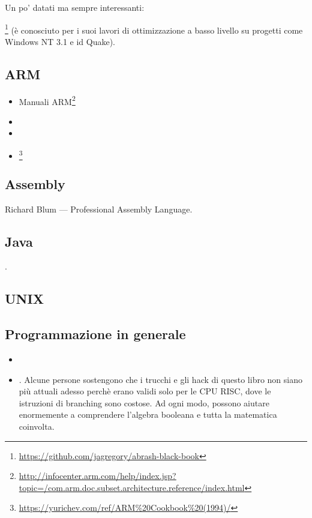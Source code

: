 Un po' datati ma sempre interessanti:

\MAbrash\footnote{\AlsoAvailableAs \url{https://github.com/jagregory/abrash-black-book}}
(è conosciuto per i suoi lavori di ottimizzazione a basso livello su progetti come Windows NT 3.1 e id Quake).

\subsection{ARM}

\begin{itemize}
\item Manuali ARM\footnote{\AlsoAvailableAs \url{http://infocenter.arm.com/help/index.jsp?topic=/com.arm.doc.subset.architecture.reference/index.html}}

\item \ARMSevenRef

\item \ARMSixFourRefURL

\item \ARMCookBook\footnote{\AlsoAvailableAs \url{https://yurichev.com/ref/ARM%20Cookbook%20(1994)/}}
\end{itemize}

\subsection{Assembly}

Richard Blum --- Professional Assembly Language.

\subsection{Java}

\JavaBook.

\subsection{UNIX}

\TAOUP

\subsection{Programmazione in generale}

\begin{itemize}

\item \RobPikePractice

\item \HenryWarren.
Alcune persone sostengono che i trucchi e gli hack di questo libro non siano più attuali adesso perchè erano validi solo per le \ac{CPU} \ac{RISC},
dove le istruzioni di branching sono costose.
Ad ogni modo, possono aiutare enormemente a comprendere l'algebra booleana e tutta la matematica coinvolta.

\end{itemize}



